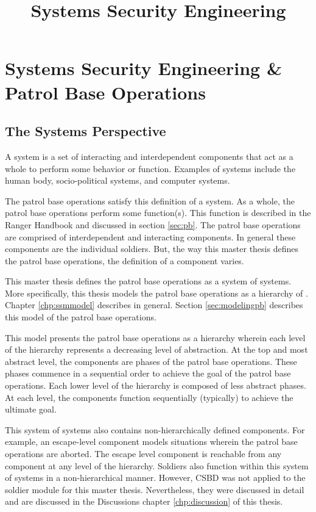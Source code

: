 \documentclass[../../main/main.tex]{subfiles}
\begin{document}
\title{Systems Security Engineering}


\chapter{Systems Security Engineering \& Patrol Base Operations}\label{chp:sse}


\section{The Systems Perspective}\label{sec:systems}
A system is a set of interacting and interdependent components that act as a whole to perform some behavior or function.  Examples of systems include the human body, socio-political systems, and computer systems. 

The patrol base operations satisfy this definition of a system.  As a whole, the patrol base operations perform some function(s).  This function is described in the Ranger Handbook \cite{rangermanual} and discussed in section \ref{sec:pb}.  The patrol base operations are comprised of interdependent and interacting components.  In general these components are the individual soldiers.  But, the way this master thesis defines the patrol base operations, the definition of a component varies.

This master thesis defines the patrol base operations as a system of systems.  More specifically, this thesis models the patrol base operations as a hierarchy of .  Chapter \ref{chp:ssmmodel} describes  in general.   Section \ref{sec:modelingpb} describes this model of the patrol base operations.  

This model presents the patrol base operations as a hierarchy wherein each level of the hierarchy represents a decreasing level of abstraction.  At the top and most abstract level, the components are phases of the patrol base operations.  These phases commence in a sequential order to achieve the goal of the patrol base operations.  Each lower level of the hierarchy is composed of less abstract phases. At each level, the components function sequentially (typically) to achieve the ultimate goal.  

This system of systems also contains non-hierarchically defined components.  For example, an escape-level component models situations wherein the patrol base operations are aborted.  The escape level component is reachable from any component at any level of the hierarchy.  Soldiers also function within this system of systems in a non-hierarchical manner.  However, CSBD was not applied to the soldier module for this master thesis.  Nevertheless, they were discussed in detail and are discussed in the Discussions chapter \ref{chp:discussion} of this thesis.
\end{document}
